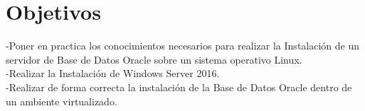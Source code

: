 \section{Objetivos}
\vspace{12pt}

-Poner en practica los conocimientos necesarios para realizar la Instalación de un servidor de Base de Datos Oracle sobre un sistema operativo Linux.\\
-Realizar la Instalación de Windows Server 2016.\\
-Realizar de forma correcta la instalación de la Base de Datos Oracle dentro de un ambiente virtualizado.\\